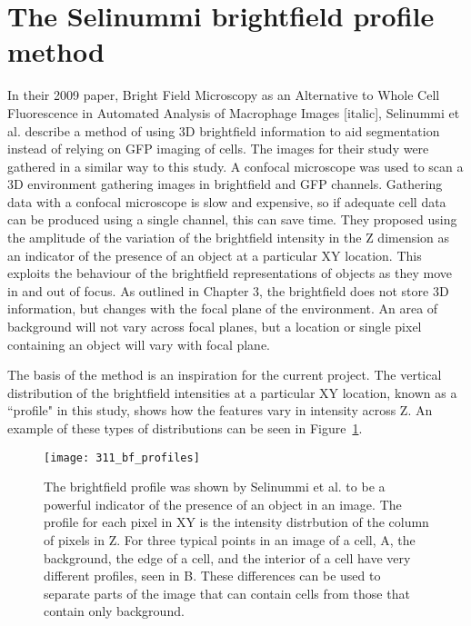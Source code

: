 \section{The Selinummi brightfield profile method}

In their 2009 paper, Bright Field Microscopy as an Alternative to Whole Cell Fluorescence in Automated Analysis of Macrophage Images [italic], Selinummi et al. describe a method of using 3D brightfield information to aid segmentation instead of relying on GFP imaging of cells. The images for their study were gathered in a similar way to this study. A confocal microscope was used to scan a 3D environment gathering images in brightfield and GFP channels. Gathering data with a confocal microscope is slow and expensive, so if adequate cell data can be produced using a single channel, this can save time. They proposed using the amplitude of the variation of the brightfield intensity in the Z dimension as an indicator of the presence of an object at a particular XY location. This exploits the behaviour of the brightfield representations of objects as they move in and out of focus. As outlined in Chapter 3, the brightfield does not store 3D information, but changes with the focal plane of the environment. An area of background will not vary across focal planes, but a location or single pixel containing an object will vary with focal plane.

The basis of the method is an inspiration for the current project. The vertical distribution of the brightfield intensities at a particular XY location, known as a ``profile" in this study, shows how the features vary in intensity across Z. An example of these types of distributions can be seen in Figure~\ref{fig:brightfieldprofile}.

\begin{figure}[h!]
 \centering
 \texttt{[image: 311\_bf\_profiles]}
 \caption[Selinummi brightfield profile]{
 	The brightfield profile was shown by Selinummi et al. to be a powerful indicator of the presence of an object in an image. The profile for each pixel in XY is the intensity distrbution of the column of pixels in Z. For three typical points in an image of a cell, A, the background, the edge of a cell, and the interior of a cell have very different profiles, seen in B. These differences can be used to separate parts of the image that can contain cells from those that contain only background.
 }
 \label{fig:brightfieldprofile}
\end{figure}

